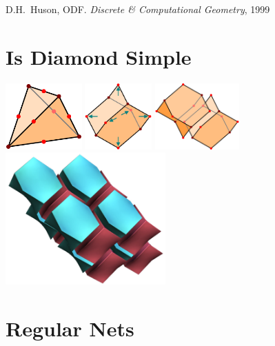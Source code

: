 \documentclass{beamer}
\begin{document}
\begin{frame}
\begin{center}
    {\small
      D.H.\ Huson, ODF. {\it Discrete \& Computational Geometry}, 1999
    }
  \end{center}
\end{frame}


\section{Is Diamond Simple}

\begin{frame}
  \begin{center}
    \includegraphics[height=1.0in]{extetra1}
    \hspace{2mm}
    \includegraphics[height=1.0in]{extetra2}
    \hspace{2mm}
    \includegraphics[height=1.0in]{extetra3}\\[2mm]
    \includegraphics[height=2.0in]{diamond-tiling}
  \end{center}
\end{frame}


\section{Regular Nets}
\end{document}
